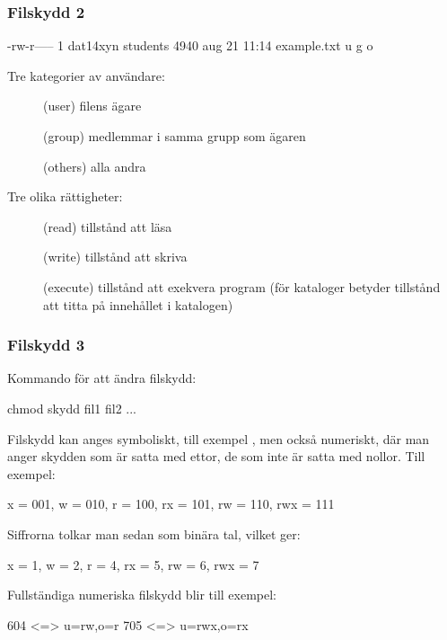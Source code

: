 \begin{frame}[fragile=singleslide]
\frametitle{Filskydd 2}
\begin{Code}
-rw-r-----  1 dat14xyn  students  4940 aug 21 11:14 example.txt
  u  g  o
\end{Code}

Tre kategorier av användare:

\begin{description}
\item[] (user) filens ägare
\item[] (group) medlemmar i samma grupp som ägaren
\item[] (others) alla andra
\end{description}

Tre olika rättigheter:

\begin{description}
\item[] (read) tillstånd att läsa
\item[] (write) tillstånd att skriva
\item[] (execute) tillstånd att exekvera program (för kataloger betyder  tillstånd att titta på innehållet i katalogen)
\end{description}

\end{frame} 

\begin{frame}[fragile=singleslide]
\frametitle{Filskydd 3}
Kommando för att ändra filskydd:

\begin{Code}
chmod skydd fil1 fil2 ...
\end{Code}

Filskydd kan anges symboliskt, till exempel , men också numeriskt, där man anger skydden som är satta med ettor, de som inte är satta med nollor. Till exempel:

\begin{Code}
x = 001, w = 010, r = 100, rx = 101, rw = 110, rwx = 111
\end{Code}


Siffrorna tolkar man sedan som binära tal, vilket ger:

\begin{Code}
x = 1, w = 2, r = 4, rx = 5, rw = 6, rwx = 7
\end{Code}


Fullständiga numeriska filskydd blir till exempel:

\begin{Code}
604 <=> u=rw,o=r    705 <=> u=rwx,o=rx
\end{Code}
\end{frame} 

